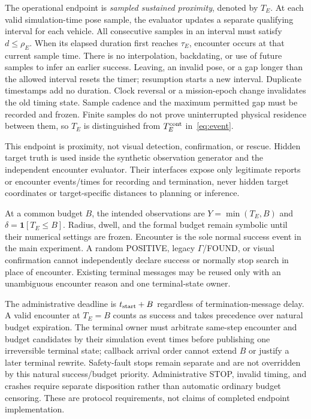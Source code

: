 \documentclass[conference]{IEEEtran}
\begin{document}
The operational endpoint is \emph{sampled sustained proximity}, denoted by $T_E$. At each valid simulation-time pose sample, the evaluator updates a separate qualifying interval for each vehicle. All consecutive samples in an interval must satisfy $d\leq\rho_E$. When its elapsed duration first reaches $\tau_E$, encounter occurs at that current sample time. There is no interpolation, backdating, or use of future samples to infer an earlier success. Leaving, an invalid pose, or a gap longer than the allowed interval resets the timer; resumption starts a new interval. Duplicate timestamps add no duration. Clock reversal or a mission-epoch change invalidates the old timing state. Sample cadence and the maximum permitted gap must be recorded and frozen. Finite samples do not prove uninterrupted physical residence between them, so $T_E$ is distinguished from $T_E^{\rm cont}$ in~\eqref{eq:event}.

This endpoint is proximity, not visual detection, confirmation, or rescue. Hidden target truth is used inside the synthetic observation generator and the independent encounter evaluator. Their interfaces expose only legitimate reports or encounter events/times for recording and termination, never hidden target coordinates or target-specific distances to planning or inference.

At a common budget $B$, the intended observations are $Y=\min(T_E,B)$ and $\delta=\mathbf1[T_E\leq B]$. Radius, dwell, and the formal budget remain symbolic until their numerical settings are frozen. Encounter is the sole normal success event in the main experiment. A random POSITIVE, legacy $\Gamma$/FOUND, or visual confirmation cannot independently declare success or normally stop search in place of encounter. Existing terminal messages may be reused only with an unambiguous encounter reason and one terminal-state owner.

The administrative deadline is $t_{\rm start}+B$ regardless of termination-message delay. A valid encounter at $T_E=B$ counts as success and takes precedence over natural budget expiration. The terminal owner must arbitrate same-step encounter and budget candidates by their simulation event times before publishing one irreversible terminal state; callback arrival order cannot extend $B$ or justify a later terminal rewrite. Safety-fault stops remain separate and are not overridden by this natural success/budget priority. Administrative STOP, invalid timing, and crashes require separate disposition rather than automatic ordinary budget censoring. These are protocol requirements, not claims of completed endpoint implementation.
\end{document}
